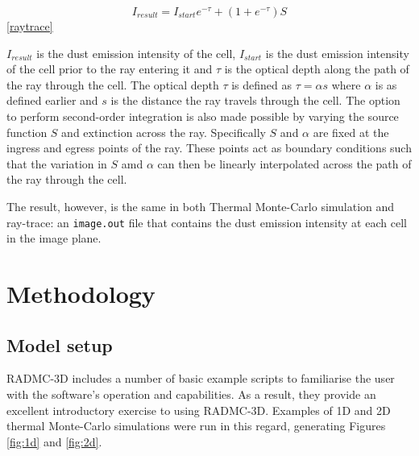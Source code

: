\documentclass{report}
\begin{document}
\begin{equation}
  I_{result} = I_{start}e^{-\tau}+(1+e^{-\tau})S
\end{equation}\ref{raytrace}

$I_{result}$ is the dust emission intensity of the cell, $I_{start}$ is the dust emission intensity of the cell prior to the ray entering it and $\tau$ is the optical depth along the path of the ray through the cell. The optical depth $\tau$ is defined as $\tau = \alpha s$ where $\alpha$ is as defined earlier and $s$ is the distance the ray travels through the cell. The option to perform second-order integration is also made possible by varying the source function $S$ and extinction across the ray. Specifically $S$ and $\alpha$ are fixed at the ingress and egress points of the ray. These points act as boundary conditions such that the variation in $S$ amd $\alpha$ can then be linearly interpolated across the path of the ray through the cell.

The result, however, is the same in both Thermal Monte-Carlo simulation and ray-trace: an \texttt{image.out} file that contains the dust emission intensity at each cell in the image plane.

\section{Methodology}

\subsection{Model setup}
RADMC-3D includes a number of basic example scripts to familiarise the user with the software's operation and capabilities. As a result, they provide an excellent introductory exercise to using RADMC-3D. Examples of 1D and 2D thermal Monte-Carlo simulations were run in this regard, generating Figures \ref{fig:1d} and \ref{fig:2d}.
\end{document}
